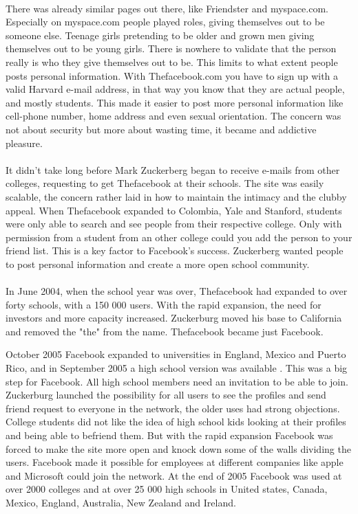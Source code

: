 \paragraph{}
There was already similar pages out there, like Friendster and myspace.com. Especially on myspace.com people played roles, giving themselves out to be someone else. Teenage girls pretending to be older and grown men giving themselves out to be young girls. There is nowhere to validate that the person really is who they give themselves out to be. This limits to what extent people posts personal information. With Thefacebook.com you have to sign up with a valid Harvard e-mail address, in that way you know that they are actual people, and mostly students. This made it easier to post more personal information like cell-phone number, home address and even sexual orientation. The concern was not about security but more about wasting time, it became and addictive pleasure. 

\paragraph{}
It didn't take long before Mark Zuckerberg began to receive e-mails from other colleges, requesting to get Thefacebook at their schools. The site was easily scalable, the concern rather laid in how to maintain the intimacy and the clubby appeal. When Thefacebook expanded to Colombia, Yale and Stanford, students were only able to search and see people from their respective college. Only with permission from a student from an other college could you add the person to your friend list. This is a key factor to Facebook's success. Zuckerberg wanted people to post personal information and create a more open school community.

\paragraph{}
In June 2004, when the school year was over, Thefacebook had expanded to over forty schools, with a 150 000 users. With the rapid expansion, the need for investors and more capacity increased. Zuckerburg moved his base to California and removed the "the" from the name. Thefacebook became just Facebook.

October 2005 Facebook expanded to universities in England, Mexico and Puerto Rico, and in September 2005 a high school version was available \cite{FacebookHistory}. This was a big step for Facebook. All high school members need an invitation to be able to join.  Zuckerburg launched the possibility for all users to see the profiles and send friend request to everyone in the network, the older uses had strong objections. College students did not like the idea of high school kids looking at their profiles and being able to befriend them. But with the rapid expansion Facebook was forced to make the site more open and knock down some of the walls dividing the users. Facebook made it possible for employees at different companies like apple and Microsoft could join the network. 
At the end of 2005 Facebook was used at over 2000 colleges and at over 25 000 high schools in United states, Canada, Mexico, England, Australia, New Zealand and Ireland. 

